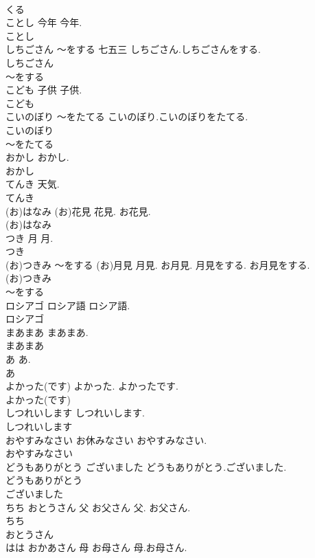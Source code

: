 \documentclass[8pt]{extreport}
\begin{document}
\begin{CJK}{UTF8}{min}
\\	くる
\\	ことし	今年	今年.	
\\	ことし
\\	しちごさん ～をする	七五三	しちごさん.しちごさんをする.	
\\	しちごさん
\\	～をする
\\	こども	子供	子供.	
\\	こども
\\	こいのぼり ～をたてる		こいのぼり.こいのぼりをたてる.	
\\	こいのぼり
\\	～をたてる
\\	おかし		おかし.	
\\	おかし
\\	てんき		天気.	
\\	てんき
\\	(お)はなみ	(お)花見	花見. お花見.	
\\	(お)はなみ
\\	つき	月	月.	
\\	つき
\\	(お)つきみ ～をする	(お)月見	月見. お月見. 月見をする. お月見をする.	
\\	(お)つきみ
\\	～をする
\\	ロシアゴ	ロシア語	ロシア語.	
\\	ロシアゴ
\\	まあまあ		まあまあ.	
\\	まあまあ
\\	あ		あ.	
\\	あ
\\	よかった(です)		よかった. よかったです.	
\\	よかった(です)
\\	しつれいします		しつれいします.	
\\	しつれいします
\\	おやすみなさい	お休みなさい	おやすみなさい.	
\\	おやすみなさい
\\	どうもありがとう ございました		どうもありがとう.ございました.	
\\	どうもありがとう
\\	ございました
\\	ちち おとうさん	父 お父さん	父. お父さん.	
\\	ちち
\\	おとうさん
\\	はは おかあさん	母 お母さん	母.お母さん.	

\end{CJK}
\end{document}
